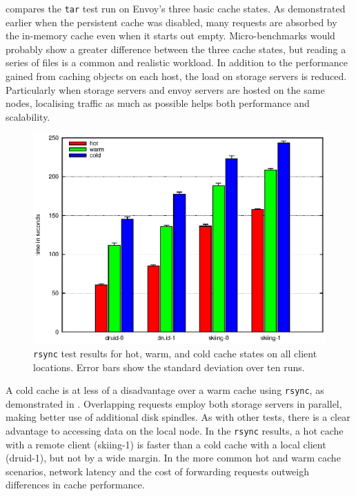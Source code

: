  compares the \texttt{tar} test run on Envoy's three basic cache states. As demonstrated earlier when the persistent cache was disabled, many requests are absorbed by the in-memory cache even when it starts out empty. Micro-benchmarks would probably show a greater difference between the three cache states, but reading a series of files is a common and realistic workload. In addition to the performance gained from caching objects on each host, the load on storage servers is reduced. Particularly when storage servers and envoy servers are hosted on the same nodes, localising traffic as much as possible helps both performance and scalability.

\begin{figure}[t]
\centering
\includegraphics[width=\figwidth]{figures/envoy-rsync}
\caption[The \texttt{rsync} test with all cache modes]{\texttt{rsync} test results for hot, warm, and cold cache states on all client locations. Error bars show the standard deviation over ten runs.}
\label{fig:envoy-rsync}
\end{figure}

A cold cache is at less of a disadvantage over a warm cache using \texttt{rsync}, as demonstrated in . Overlapping requests employ both storage servers in parallel, making better use of additional disk spindles. As with other tests, there is a clear advantage to accessing data on the local node. In the \texttt{rsync} results, a hot cache with a remote client (skiing-1) is faster than a cold cache with a local client (druid-1), but not by a wide margin. In the more common hot and warm cache scenarios, network latency and the cost of forwarding requests outweigh differences in cache performance.


